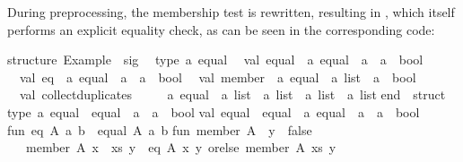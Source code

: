 \begin{isabellebody}
{\isafoldquote}%
%
\isadelimquote
%
\endisadelimquote
%
\begin{isamarkuptext}%
\noindent During preprocessing, the membership test is rewritten,
  resulting in , which itself performs an explicit
  equality check, as can be seen in the corresponding  code:%
\end{isamarkuptext}%
\isamarkuptrue%
%
\isadelimtypewriter
%
\endisadelimtypewriter
%
\isatagtypewriter
%
\begin{isamarkuptext}%
structure\ Example\ {\isacharcolon}\ sig\isanewline
\ \ type\ {\isacharprime}a\ equal\isanewline
\ \ val\ equal\ {\isacharcolon}\ {\isacharprime}a\ equal\ {\isacharminus}{\isachargreater}\ {\isacharprime}a\ {\isacharminus}{\isachargreater}\ {\isacharprime}a\ {\isacharminus}{\isachargreater}\ bool\isanewline
\ \ val\ eq\ {\isacharcolon}\ {\isacharprime}a\ equal\ {\isacharminus}{\isachargreater}\ {\isacharprime}a\ {\isacharminus}{\isachargreater}\ {\isacharprime}a\ {\isacharminus}{\isachargreater}\ bool\isanewline
\ \ val\ member\ {\isacharcolon}\ {\isacharprime}a\ equal\ {\isacharminus}{\isachargreater}\ {\isacharprime}a\ list\ {\isacharminus}{\isachargreater}\ {\isacharprime}a\ {\isacharminus}{\isachargreater}\ bool\isanewline
\ \ val\ collect{\isacharunderscore}duplicates\ {\isacharcolon}\isanewline
\ \ \ \ {\isacharprime}a\ equal\ {\isacharminus}{\isachargreater}\ {\isacharprime}a\ list\ {\isacharminus}{\isachargreater}\ {\isacharprime}a\ list\ {\isacharminus}{\isachargreater}\ {\isacharprime}a\ list\ {\isacharminus}{\isachargreater}\ {\isacharprime}a\ list\isanewline
end\ {\isacharequal}\ struct\isanewline
\isanewline
type\ {\isacharprime}a\ equal\ {\isacharequal}\ {\isacharbraceleft}equal\ {\isacharcolon}\ {\isacharprime}a\ {\isacharminus}{\isachargreater}\ {\isacharprime}a\ {\isacharminus}{\isachargreater}\ bool{\isacharbraceright}{\isacharsemicolon}\isanewline
val\ equal\ {\isacharequal}\ {\isacharhash}equal\ {\isacharcolon}\ {\isacharprime}a\ equal\ {\isacharminus}{\isachargreater}\ {\isacharprime}a\ {\isacharminus}{\isachargreater}\ {\isacharprime}a\ {\isacharminus}{\isachargreater}\ bool{\isacharsemicolon}\isanewline
\isanewline
fun\ eq\ A{\isacharunderscore}\ a\ b\ {\isacharequal}\ equal\ A{\isacharunderscore}\ a\ b{\isacharsemicolon}\isanewline
\isanewline
fun\ member\ A{\isacharunderscore}\ {\isacharbrackleft}{\isacharbrackright}\ y\ {\isacharequal}\ false\isanewline
\ \ {\isacharbar}\ member\ A{\isacharunderscore}\ {\isacharparenleft}x\ {\isacharcolon}{\isacharcolon}\ xs{\isacharparenright}\ y\ {\isacharequal}\ eq\ A{\isacharunderscore}\ x\ y\ orelse\ member\ A{\isacharunderscore}\ xs\ y{\isacharsemicolon}\isanewline

\end{isamarkuptext}
\end{isabellebody}
